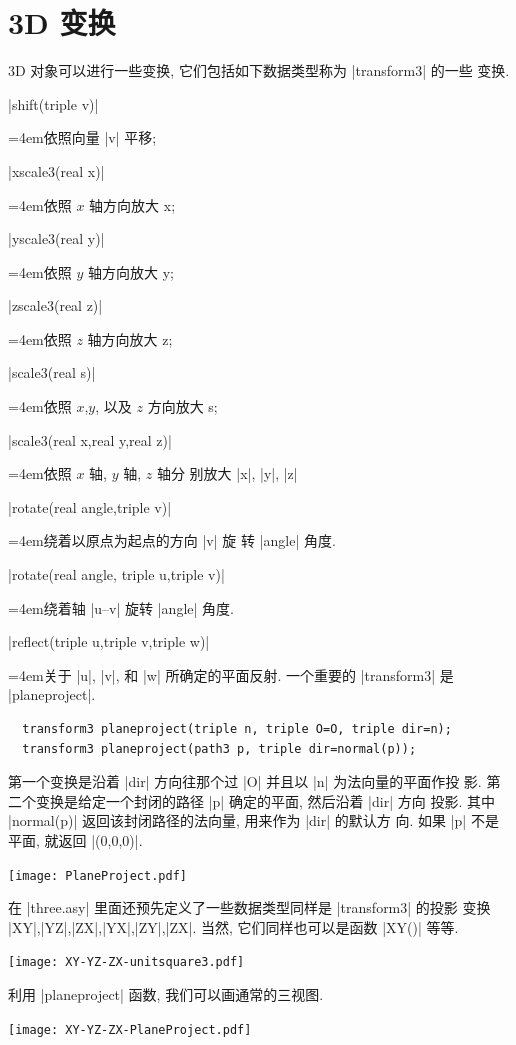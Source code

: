 \documentclass{ctexbook}
\newenvironment{funclist}{\trivlist
  \parindent=0pt
\item[]
  \def\item{\medskip\par\leftskip=0pt}
  \def\go{\par\leftskip=4em}}
{\endtrivlist}
\begin{document}
\section{3D 变换}
3D 对象可以进行一些变换, 它们包括如下数据类型称为 |transform3| 的一些
变换.
\begin{funclist}
\item |shift(triple v)| \go 依照向量 |v| 平移;
\item |xscale3(real x)| \go 依照 $x$ 轴方向放大 x;
\item |yscale3(real y)| \go 依照 $y$ 轴方向放大 y;
\item |zscale3(real z)| \go 依照 $z$ 轴方向放大 z;
\item |scale3(real s)|   \go 依照 $x$,$y$, 以及 $z$ 方向放大 s;
\item |scale3(real x,real y,real z)| \go 依照 $x$ 轴, $y$ 轴, $z$ 轴分
  别放大 |x|, |y|, |z|
\item |rotate(real angle,triple v)| \go 绕着以原点为起点的方向 |v| 旋
  转 |angle| 角度.
\item |rotate(real angle, triple u,triple v)| \go 绕着轴 |u--v| 旋转
  |angle| 角度.
\item |reflect(triple u,triple v,triple w)| \go 关于 |u|, |v|, 和 |w|
  所确定的平面反射.
\end{funclist}
一个重要的 |transform3| 是 |planeproject|.
\begin{lstlisting}
  transform3 planeproject(triple n, triple O=O, triple dir=n);
  transform3 planeproject(path3 p, triple dir=normal(p));
\end{lstlisting}
第一个变换是沿着 |dir| 方向往那个过 |O| 并且以 |n| 为法向量的平面作投
影. 第二个变换是给定一个封闭的路径 |p| 确定的平面, 然后沿着 |dir| 方向
投影. 其中 |normal(p)| 返回该封闭路径的法向量, 用来作为 |dir| 的默认方
向. 如果 |p| 不是平面, 就返回 |(0,0,0)|.
\begin{center}\texttt{[image: PlaneProject.pdf]}\end{center}%

在 |three.asy| 里面还预先定义了一些数据类型同样是 |transform3| 的投影
变换 |XY|,|YZ|,|ZX|,|YX|,|ZY|,|ZX|. 当然, 它们同样也可以是函数 |XY()|
等等.
\begin{center}\texttt{[image: XY-YZ-ZX-unitsquare3.pdf]}\end{center}%

利用 |planeproject| 函数, 我们可以画通常的三视图.
\begin{center}\texttt{[image: XY-YZ-ZX-PlaneProject.pdf]}\end{center}%

\end{document}
